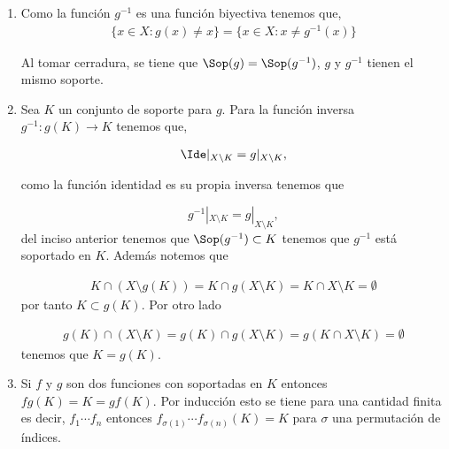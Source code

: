 \begin{ob} \label{ob:sop_fun_inversa}
\begin{enumerate}
Sea $g:X \to X$ un homeomorfismo que está soportado en $K$.
    \item Como la función $g^{-1}$ es una función biyectiva tenemos que, 
    \begin{align*}
        \{x \in X : g(x) \neq x \}  = \{x \in X : x \neq g^{-1}(x) \}         
    \end{align*}
    
    Al tomar cerradura, se tiene que $\Sop(g) = \Sop(g^{-1})$,  $g$ y $g^{-1}$ tienen el mismo soporte. 
     
    \item Sea $K$ un conjunto de soporte para $g$. Para la función inversa $g^{-1}:g(K) \to K$ tenemos que,

\begin{align*}
\Ide|_{X \setminus K}=g|_{X \setminus K},
\end{align*}

como la función identidad es su propia inversa tenemos que 

$$g^{-1}|_{X \setminus K}=g|_{X \setminus K},$$
 del inciso anterior tenemos que $\Sop(g^{-1}) \subset K$ tenemos que $g^{-1}$ está soportado en $K$. Además notemos que
 
\begin{align*}
K \cap (X \setminus g(K))=K \cap g(X \setminus K)=K \cap X \setminus K = \emptyset
\end{align*}
por tanto $K \subset g(K)$. Por otro lado

\begin{align*}
g(K) \cap (X \setminus K)=g(K) \cap g(X \setminus K)=g(K \cap X \setminus K) = \emptyset
\end{align*}
tenemos que $K=g(K)$.
\item Si $f$ y $g$ son dos funciones con soportadas en $K$ entonces $fg(K)=K=gf(K).$ Por inducción esto se tiene para una cantidad finita es decir, $f_1 \cdots f_n$ entonces $f_{\sigma(1)} \cdots f_{\sigma(n)}(K)=K$ para $\sigma$ una permutación de índices.   
\end{enumerate}

\end{ob}


